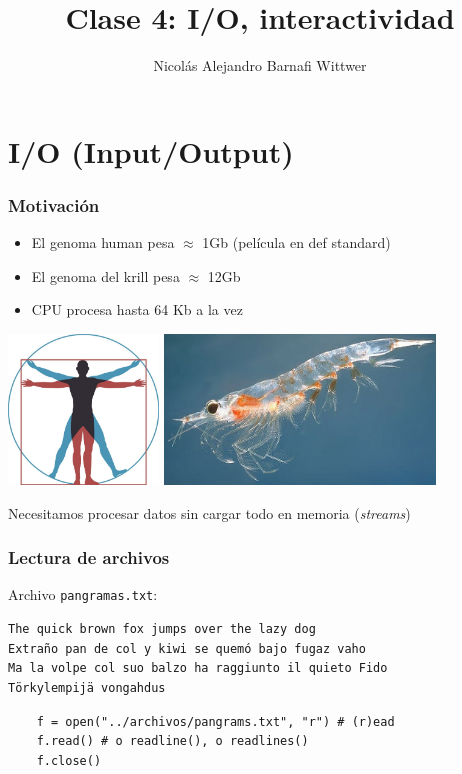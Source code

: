 \documentclass[14pt,aspectratio=169,xcolor=dvipsnames]{beamer}
\title[short title]{Clase 4: I/O, interactividad}
\subtitle{}
\author[NA Barnafi] {Nicolás Alejandro Barnafi Wittwer}
\institute[UC|CMM] 
{
    Pontificia Universidad Católica de Chile \\
    Centro de Modelamiento Matemático
}
\date{}
\begin{document}
\begin{frame}
    \maketitle
\end{frame}
\section{I/O (Input/Output)}
\begin{frame}\frametitle{Motivación}
    \begin{itemize}
        \item El genoma human pesa $\approx$ 1Gb (película en def standard)
        \item El genoma del krill pesa $\approx$ 12Gb
        \item CPU procesa hasta 64 Kb a la vez
    \end{itemize}
    \hspace{2cm}\includegraphics[height=4cm]{../images/vitruvio.jpg}
    \includegraphics[height=4cm]{../images/krill.jpg}

\pause Necesitamos procesar datos sin cargar todo en memoria (\emph{streams})
\end{frame}
\begin{frame}[fragile]\frametitle{Lectura de archivos}
Archivo \texttt{pangramas.txt}:
    \begin{verbatim}
The quick brown fox jumps over the lazy dog
Extraño pan de col y kiwi se quemó bajo fugaz vaho
Ma la volpe col suo balzo ha raggiunto il quieto Fido
Törkylempijä vongahdus
    \end{verbatim}

    \begin{verbatim}
    f = open("../archivos/pangrams.txt", "r") # (r)ead
    f.read() # o readline(), o readlines()
    f.close()
    \end{verbatim}
\end{frame}
\end{document}
